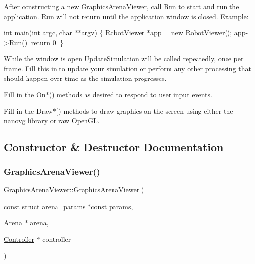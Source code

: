 After constructing a new \mbox{\hyperlink{class_graphics_arena_viewer}{Graphics\+Arena\+Viewer}}, call Run to start and run the application. Run will not return until the application window is closed. Example\+:


\begin{DoxyCode}
\textcolor{keywordtype}{int} main(\textcolor{keywordtype}{int} argc, \textcolor{keywordtype}{char} **argv) \{
    RobotViewer *app = \textcolor{keyword}{new} RobotViewer();
    app->Run();
    \textcolor{keywordflow}{return} 0;
\}
\end{DoxyCode}


While the window is open Update\+Simulation will be called repeatedly, once per frame. Fill this in to update your simulation or perform any other processing that should happen over time as the simulation progresses.

Fill in the {\ttfamily On$\ast$()} methods as desired to respond to user input events.

Fill in the {\ttfamily Draw$\ast$()} methods to draw graphics on the screen using either the {\ttfamily nanovg} library or raw {\ttfamily Open\+GL}. 

\subsection{Constructor \& Destructor Documentation}
\mbox{\label{class_graphics_arena_viewer_a869510833897508300da65b1eb0c5d09}} 
\subsubsection{\texorpdfstring{Graphics\+Arena\+Viewer()}{GraphicsArenaViewer()}}
{\footnotesize\ttfamily Graphics\+Arena\+Viewer\+::\+Graphics\+Arena\+Viewer (\begin{DoxyParamCaption}\item[{const struct \mbox{\hyperlink{structarena__params}{arena\+\_\+params}} $\ast$const}]{params,  }\item[{\mbox{\hyperlink{class_arena}{Arena}} $\ast$}]{arena,  }\item[{\mbox{\hyperlink{class_controller}{Controller}} $\ast$}]{controller }\end{DoxyParamCaption})\hspace{0.3cm}{\ttfamily [explicit]}}



